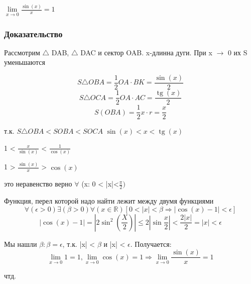 \opred
 $\lim\limits_{x\rightarrow 0} \frac{\sin(x)}{x}=1$

\subsubsection{Доказательство}

Рассмотрим $\triangle$ DAB, $\triangle$ DAC и сектор OAB.
x-длинна дуги.
При x $\rightarrow$ 0 их S уменьшаются


$$ S\triangle{OBA} = \frac{1}{2}OA \cdot BK = \frac{\sin(x)}{2}$$
$$ S\triangle{OCA} = \frac{1}{2}OA \cdot AC = \frac{\operatorname{tg}(x)}{2}$$
$$ S(OBA) = \frac{1}{2}x \cdot r = \frac{x}{2}$$

т.к. $ S\triangle OBA < SOBA < SOCA$
$\sin(x) < x < \operatorname{tg}(x)$

  1  < $\frac{x}{\sin(x)}$ < $\frac{1}{\cos(x)}$

  1 > $\frac{\sin(x)}{x}$ > $\cos(x)$

  это неравенство верно $\forall$ (x: 0 < |x|<$\frac{\pi}{2})$

  Функция, перел которой надо найти лежит между двумя функциями
   $$\forall(\epsilon>0)\exists(\beta>0)\forall(x \in \mathbb{R})[0 < |x| <\beta \Rightarrow |\cos(x) - 1| < \epsilon]$$
  $$|\cos(x) - 1| = |2\sin^2(\frac{X}{2})| \leq 2|\sin\frac{x}{2}| < \frac{2|x|}{2} = |x| < \epsilon$$

  Мы нашли $\beta : \beta = \epsilon$, т.к. |x| < $\beta$ и |x| < $\epsilon$. Получается:
  $$\lim\limits_{x\rightarrow 0}1=1, \lim\limits_{x \rightarrow 0}\cos(x) = 1
  \Rightarrow \lim\limits_{x \rightarrow 0}\frac{\sin(x)}{x}=1$$

  чтд.

